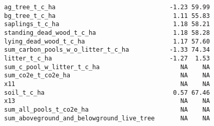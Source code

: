 \documentclass[
]{article}
\begin{document}
\begin{verbatim}
ag_tree_t_c_ha                               -1.23 59.99
bg_tree_t_c_ha                                1.11 55.83
saplings_t_c_ha                               1.18 58.21
standing_dead_wood_t_c_ha                     1.18 58.28
lying_dead_wood_t_c_ha                        1.17 57.60
sum_carbon_pools_w_o_litter_t_c_ha           -1.33 74.34
litter_t_c_ha                                -1.27  1.53
sum_c_pool_w_litter_t_c_ha                      NA    NA
sum_co2e_t_co2e_ha                              NA    NA
x11                                             NA    NA
soil_t_c_ha                                   0.57 67.46
x13                                             NA    NA
sum_all_pools_t_co2e_ha                         NA    NA
sum_aboveground_and_belowground_live_tree       NA    NA
\end{verbatim}
\end{document}
